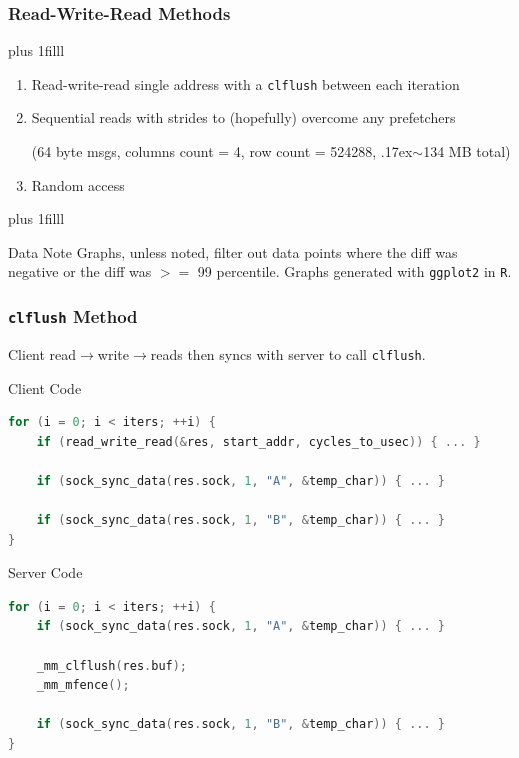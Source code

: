 \documentclass{beamer}
\begin{document}
\begin{frame}
 \frametitle{Read-Write-Read Methods}

 \vskip0pt plus 1filll
 \begin{enumerate}
  \item Read-write-read single address with a \texttt{clflush} between each iteration
  \item Sequential reads with strides to (hopefully) overcome any prefetchers

         {\tiny (64 byte msgs, columns count = 4, row count = 524288, {\raise.17ex\hbox{$\scriptstyle\mathtt{\sim}$}}134 MB total)}
  \item Random access
 \end{enumerate}

 \vskip0pt plus 1filll
 \begin{block}{\footnotesize{}Data Note}
  \footnotesize
  Graphs, unless noted, filter out data points where the diff was negative or the diff was $>=$ 99 percentile.
  Graphs generated with \texttt{ggplot2} in \texttt{R}.
 \end{block}
 \vspace{20pt}
\end{frame}

\begin{frame}[t,fragile]
 \frametitle{\texttt{clflush} Method}
 Client read$\rightarrow$write$\rightarrow$reads then syncs with server to call \texttt{clflush}.

 \begin{block}{Client Code}

  \begin{lstlisting}[frame=single, language=C, basicstyle=\tiny]
for (i = 0; i < iters; ++i) {
    if (read_write_read(&res, start_addr, cycles_to_usec)) { ... }

    if (sock_sync_data(res.sock, 1, "A", &temp_char)) { ... }

    if (sock_sync_data(res.sock, 1, "B", &temp_char)) { ... }
}
 \end{lstlisting}
 \end{block}

 \begin{block}{Server Code}
  \begin{lstlisting}[frame=single, language=C, basicstyle=\tiny]
for (i = 0; i < iters; ++i) {
    if (sock_sync_data(res.sock, 1, "A", &temp_char)) { ... }

    _mm_clflush(res.buf);
    _mm_mfence();

    if (sock_sync_data(res.sock, 1, "B", &temp_char)) { ... }
}
 \end{lstlisting}
 \end{block}

\end{frame}
\end{document}
